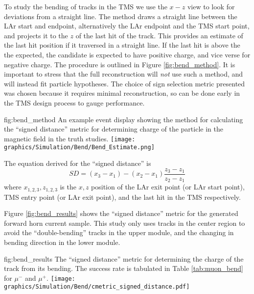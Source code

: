 To study the bending of tracks in the TMS we use the $x-z$ view to look for deviations from a straight line. The method draws a straight line between the LAr start and endpoint, alternatively the LAr endpoint and the TMS start point, and projects it to the $z$ of the last hit of the track. This provides an estimate of the last hit position if it traversed in a straight line. If the last hit is above the the expected, the candidate is expected to have positive charge, and vice verse for negative charge. The procedure is outlined in Figure \ref{fig:bend_method}. It is important to stress that the full reconstruction will \emph{not} use such a method, and will instead fit particle hypotheses. The choice of sign selection metric presented was chosen because it requires minimal reconstruction, so can be done early in the TMS design process to gauge performance.
\begin{dunefigure}[]{fig:bend_method}
{An example event display showing the method for calculating the ``signed distance'' metric for determining charge of the particle in the magnetic field in the truth studies.}
\texttt{[image: graphics/Simulation/Bend/Bend\_Estimate.png]}
\end{dunefigure}

The equation derived for the ``signed distance'' is
\begin{equation}
    SD = (x_3-x_1) - (x_2-x_1)\frac{z_3-z_1}{z_2-z_1}
\end{equation}
where $x_{1,2,3},z_{1,2,3}$ is the $x,z$ position of the LAr exit point (or LAr start point), TMS entry point (or LAr exit point), and the last hit in the TMS respectively.

Figure \ref{fig:bend_results} shows the ``signed distance'' metric for the generated forward horn current sample. This study only uses tracks in the center region to avoid the ``double-bending'' tracks in the upper module, and the changing in bending direction in the lower module.

\begin{dunefigure}[]{fig:bend_results}
{The ``signed distance'' metric for determining the charge of the track from its bending. The success rate is tabulated in 
Table \ref{tab:muon_bend} for $\mu^-$ and $\mu^+$.}
\texttt{[image: graphics/Simulation/Bend/cmetric\_signed\_distance.pdf]}
\end{dunefigure}

